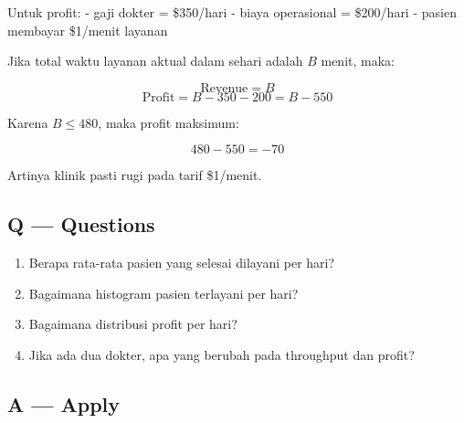 \documentclass[
  letterpaper,
  DIV=11,
  numbers=noendperiod]{scrreprt}
\providecommand{\tightlist}{%
  \setlength{\itemsep}{0pt}\setlength{\parskip}{0pt}}
\begin{document}
Untuk profit: - gaji dokter = \$350/hari - biaya operasional =
\$200/hari - pasien membayar \$1/menit layanan

Jika total waktu layanan aktual dalam sehari adalah \(B\) menit, maka:

\[
\text{Revenue} = B
\] \[
\text{Profit} = B - 350 - 200 = B - 550
\]

Karena \(B \le 480\), maka profit maksimum:

\[
480 - 550 = -70
\]

Artinya klinik pasti rugi pada tarif \$1/menit.

\subsection{Q --- Questions}\label{q-questions-6}

\begin{enumerate}
\def\labelenumi{\arabic{enumi}.}
\tightlist
\item
  Berapa rata-rata pasien yang selesai dilayani per hari?
\item
  Bagaimana histogram pasien terlayani per hari?
\item
  Bagaimana distribusi profit per hari?
\item
  Jika ada dua dokter, apa yang berubah pada throughput dan profit?
\end{enumerate}

\subsection{A --- Apply}\label{a-apply-6}
\end{document}

